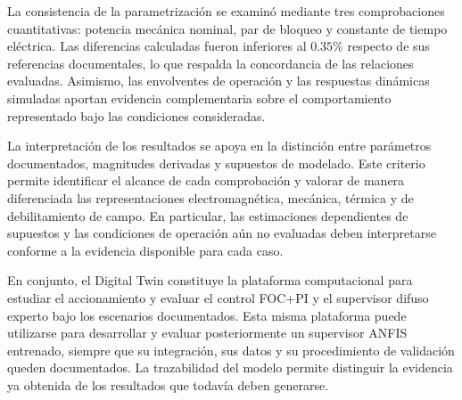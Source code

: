 La consistencia de la parametrización se examinó mediante tres comprobaciones cuantitativas: potencia mecánica nominal, par de bloqueo y constante de tiempo eléctrica. Las diferencias calculadas fueron inferiores al $0.35\%$ respecto de sus referencias documentales, lo que respalda la concordancia de las relaciones evaluadas. Asimismo, las envolventes de operación y las respuestas dinámicas simuladas aportan evidencia complementaria sobre el comportamiento representado bajo las condiciones consideradas.

La interpretación de los resultados se apoya en la distinción entre parámetros documentados, magnitudes derivadas y supuestos de modelado. Este criterio permite identificar el alcance de cada comprobación y valorar de manera diferenciada las representaciones electromagnética, mecánica, térmica y de debilitamiento de campo. En particular, las estimaciones dependientes de supuestos y las condiciones de operación aún no evaluadas deben interpretarse conforme a la evidencia disponible para cada caso.

En conjunto, el Digital Twin constituye la plataforma computacional para estudiar el accionamiento y evaluar el control FOC+PI y el supervisor difuso experto bajo los escenarios documentados. Esta misma plataforma puede utilizarse para desarrollar y evaluar posteriormente un supervisor ANFIS entrenado, siempre que su integración, sus datos y su procedimiento de validación queden documentados. La trazabilidad del modelo permite distinguir la evidencia ya obtenida de los resultados que todavía deben generarse.